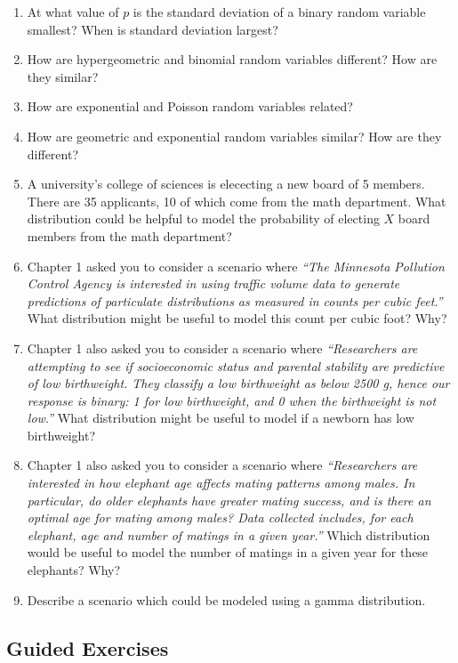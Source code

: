 \documentclass[
]{krantz}
\begin{document}
\begin{enumerate}
\def\labelenumi{\arabic{enumi}.}
\item
  At what value of \(p\) is the standard deviation of a binary random variable smallest? When is standard deviation largest?
\item
  How are hypergeometric and binomial random variables different? How are they similar?
\item
  How are exponential and Poisson random variables related?
\item
  How are geometric and exponential random variables similar? How are they different?
\item
  A university's college of sciences is elececting a new board of 5 members. There are 35 applicants, 10 of which come from the math department. What distribution could be helpful to model the probability of electing \(X\) board members from the math department?
\item
  Chapter 1 asked you to consider a scenario where \emph{``The Minnesota Pollution Control Agency is interested in using traffic volume data to generate predictions of particulate distributions as measured in counts per cubic feet.''} What distribution might be useful to model this count per cubic foot? Why?
\item
  Chapter 1 also asked you to consider a scenario where \emph{``Researchers are attempting to see if socioeconomic status and parental stability are predictive of low birthweight. They classify a low birthweight as below 2500 g, hence our response is binary: 1 for low birthweight, and 0 when the birthweight is not low.''} What distribution might be useful to model if a newborn has low birthweight?
\item
  Chapter 1 also asked you to consider a scenario where \emph{``Researchers are interested in how elephant age affects mating patterns among males. In particular, do older elephants have greater mating success, and is there an optimal age for mating among males? Data collected includes, for each elephant, age and number of matings in a given year.''} Which distribution would be useful to model the number of matings in a given year for these elephants? Why?
\item
  Describe a scenario which could be modeled using a gamma distribution.
\end{enumerate}

\hypertarget{guided-exercises-2}{%
\subsection{Guided Exercises}\label{guided-exercises-2}}
\end{document}
